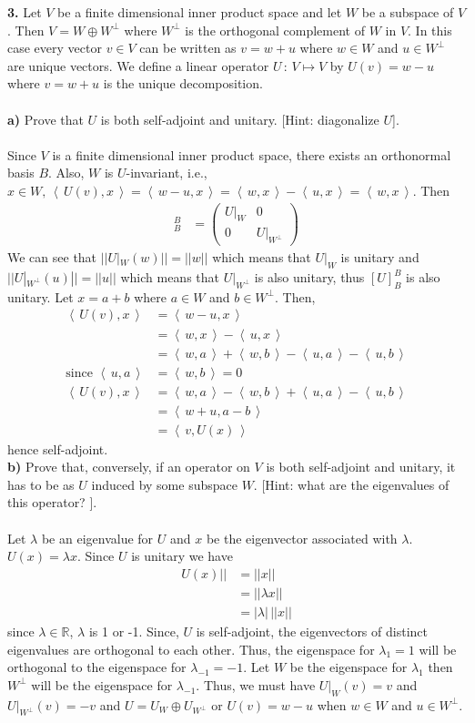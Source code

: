 \documentclass[11pt]{amsart}
\theoremstyle{definition}  %
\newcommand{\R}{\mathbb{R}}
\newcommand{\IP}[1]{\left \langle\, #1 \,\right \rangle}
\begin{document}
\newpage
\vskip 0.1cm
\noindent
{\bf 3.}  Let $V$ be a finite dimensional inner product space and let $W$ be a subspace of $V$. Then $V = W \oplus W^\perp$ where $W^\perp$ is the orthogonal complement 
of $W$ in $V$. In this case every vector $ v \in V$ can be written as $v = w+u$ where $w \in W$ and $u \in W^\perp$ are unique vectors. We define a linear operator $U \, : \, V \mapsto V$
by $U(v) = w-u$ where $v = w + u$ is the unique decomposition. \\ \\
{\bf a)} Prove that $U$ is both self-adjoint and unitary. [Hint: diagonalize $U$].\\
\\
Since $V$ is a finite dimensional inner product space, there exists an orthonormal basis $B$.  Also, $W$ is $U$-invariant, i.e., $x \in W, \, \IP{U(v),x} = \IP{w-u,x} = \IP{w,x}-\IP{u,x}=\IP{w,x}$.  Then
\begin{align*}
	[U]_B^B &= \left( \begin{array}{cc}
		U|_W & 0 \\
		0 & U|_{W^\perp}
\end{array}	 \right)
\end{align*}We can see that $||U|_W(w)||=||w||$ which means that $U|_W$ is unitary and $||U|_{W^\perp}(u)||=||u||$ which means that $U|_{W^\perp}$ is also unitary, thus $[U]_B^B$ is also unitary.  Let $x=a+b$ where $a \in W$ and $b \in W^\perp$. Then,
\begin{align*}
	\IP{U(v),x} &= \IP{w-u,x} \\
	&=\IP{w,x}-\IP{u,x}\\
	&=\IP{w,a}+\IP{w,b}-\IP{u,a}-\IP{u,b}\\
	\text{since } \IP{u,a} &= \IP{w,b} = 0\\
	\IP{U(v),x}&=\IP{w,a}-\IP{w,b}+\IP{u,a}-\IP{u,b}\\
	&= \IP{w+u,a-b}\\
	&= \IP{v, U(x)}
\end{align*} hence self-adjoint.
\\

{\bf b)} Prove that, conversely, if an operator on $V$ is both self-adjoint and unitary, it has to be as $U$ induced by some subspace $W$. [Hint: what are the eigenvalues of this operator? ]. \\
\\
Let $\lambda$ be an eigenvalue for $U$ and $x$ be the  eigenvector associated with $\lambda$.  $U(x) = \lambda x$.  Since $U$ is unitary we have 
\begin{align*}
	U(x)|| &= ||x|| \\
	&= ||\lambda x||\\
	&= |\lambda|\, ||x||
\end{align*}since $\lambda \in \R$, $\lambda$ is 1 or -1.
 Since, $U$ is self-adjoint, the eigenvectors of distinct eigenvalues are orthogonal to each other.  Thus, the eigenspace for $\lambda_1=1$ will be orthogonal to the eigenspace for $\lambda_{-1} = -1$.  Let $W$ be the eigenspace for $\lambda_1$ then $W^\perp$ will be the eigenspace for $\lambda_{-1}$.  Thus, we must have $U|_W(v)=v$ and $U|_{W^\perp}(v)=-v$ and $U=U_W\oplus U_{W^\perp}$ or $U(v)=w-u$ when $w\in W$ and $u\in W^\perp$.
 
\end{document}
